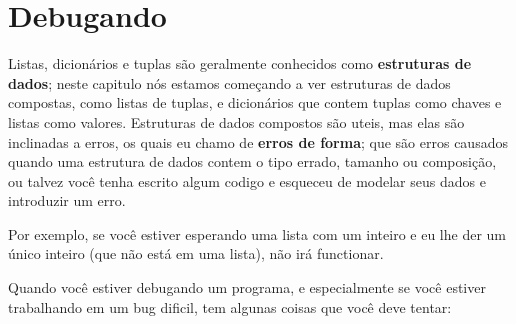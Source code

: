 \section{Debugando}


Listas, dicionários e tuplas são geralmente conhecidos como {\bf estruturas
de dados}; neste capitulo nós estamos começando a ver estruturas de dados
compostas, como listas de tuplas, e dicionários que contem tuplas como
chaves e listas como valores. Estruturas de dados compostos são uteis, mas
elas são inclinadas a erros, os quais eu chamo de {\bf erros de forma};
que são erros causados quando uma estrutura de dados contem o tipo errado,
tamanho ou composição, ou talvez você tenha escrito algum codigo e esqueceu de 
modelar seus dados e introduzir um erro.

Por exemplo, se você estiver esperando uma lista com um inteiro e eu
lhe der um único inteiro (que não está em uma lista), não irá functionar.

Quando você estiver debugando um programa, e especialmente se você
estiver trabalhando em um bug dificil, tem algunas coisas que você 
deve tentar:

